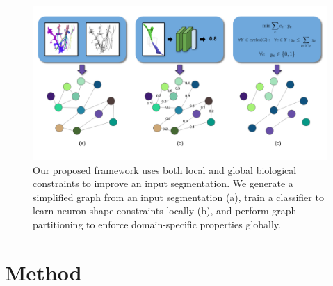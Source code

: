 \begin{figure}[t!]
	\centering
	\includegraphics[width=\linewidth]{./figures/teaser-image.png}
	\caption{Our proposed framework uses both local and global biological constraints to improve an input segmentation. We generate a simplified graph from an input segmentation (a), train a classifier to learn neuron shape constraints locally (b), and perform graph partitioning to enforce domain-specific properties globally.}
	\label{fig:teaser_pipeline}
\end{figure}
\section{Method}


